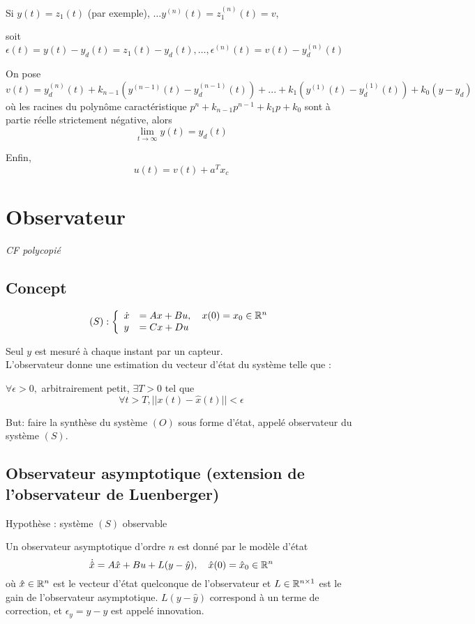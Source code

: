 \documentclass[main.tex]{subfiles}
\begin{document}
Si $y(t) = z_1(t)$ (par exemple), $\dots y^{(n)}(t) = z_1^{(n)}(t) = v$,

soit $\epsilon(t) = y(t) - y_d(t) = z_1(t) - y_d(t),\dots,\epsilon^{(n)}(t) = v(t) - y_d^{(n)}(t)$

On pose \[v(t) = y_d^{(n)}(t) + k_{n-1}(y^{(n-1)}(t)-y_d^{(n-1)}(t)) + ... + k_1 (y^{(1)}(t)-y_d^{(1)}(t)) + k_0(y-y_d)\]
où les racines du polynôme caractéristique $p^n + k_{n-1}p^{n-1} + k_1p+k_0$ sont à partie réelle strictement négative, alors
\[\lim_{t\rightarrow \infty} y(t) = y_d(t) \]

Enfin, \[u(t) = v(t) + a^Tx_c\]

\newpage
\section{Observateur}
\emph{CF polycopié}
\subsection{Concept}
\[ (S) :
\left\{
\begin{array}{ll}
\dot{x} &= Ax + Bu,\quad x(0) = x_0 \in \mathbb{R}^n \\
y & = Cx+Du
\end{array}
\right.
\]

Seul $y$ est mesuré à chaque instant par un capteur.\\

L'observateur donne une estimation du vecteur d'état du système telle que :

$\forall \epsilon > 0,$ arbitrairement petit, $\exists T > 0$ tel que
\[ \forall t > T, ||x(t) - \hat{x}(t) || < \epsilon \]

But: faire la synthèse du système $(O)$ sous forme d'état, appelé observateur du système $(S)$.

\subsection{Observateur asymptotique (extension de l'observateur de Luenberger)}

Hypothèse : système $(S)$ observable

\begin{defin}
Un observateur asymptotique d'ordre $n$ est donné par le modèle d'état \[\dot{\hat{x}}=A\hat{x}+Bu+L(y- \hat{y}), \quad \hat{x}(0)=\hat{x}_0\in\mathbb{R}^n\] où $\hat{x}\in \mathbb{R}^n$ est le vecteur d'état quelconque de l'observateur et $L\in\mathbb{R}^{n\times 1}$ est le gain de l'observateur asymptotique. $L(y- \hat{y})$ correspond à un terme de correction, et $\epsilon_y=y-\hat{y}$ est appelé innovation.
\end{defin}
\end{document}
